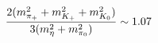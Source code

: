 \begin{equation}
{2(m_{\pi_+}^2+m_{K_+}^2+m_{K_0}^2)
\over 3(m_{\eta}^2+m_{\pi_0}^2)} \sim 1.07
\end{equation} 

